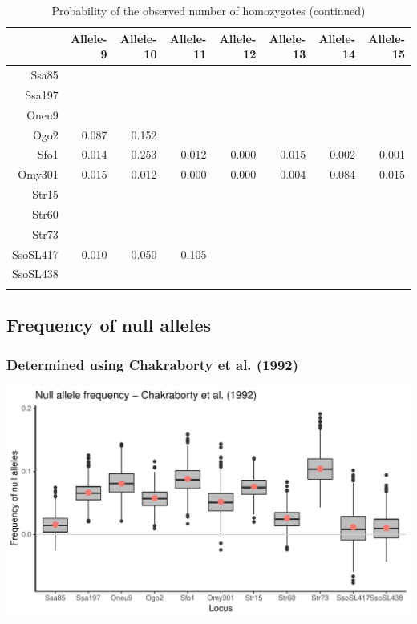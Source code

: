 \documentclass[a4paper]{scrartcl}\usepackage[]{graphicx}\usepackage[]{color}
\makeatletter
\def\maxwidth{ %
  \ifdim\Gin@nat@width>\linewidth
    \linewidth
  \else
    \Gin@nat@width
  \fi
}
\newenvironment{knitrout}{}{} %
\makeatother
\begin{document}
\begin{table}[ht]
\centering
\begin{tabular}{rrrrrrrr}
  \hline
 & Allele-9 & Allele-10 & Allele-11 & Allele-12 & Allele-13 & Allele-14 & Allele-15 \\ 
  \hline
Ssa85 &  &  &  &  &  &  &  \\ 
   \rowcolor[gray]{0.9} Ssa197 &  &  &  &  &  &  &  \\ 
  Oneu9 &  &  &  &  &  &  &  \\ 
   \rowcolor[gray]{0.9} Ogo2 & 0.087 & 0.152 &  &  &  &  &  \\ 
  Sfo1 & 0.014 & 0.253 & 0.012 & 0.000 & 0.015 & 0.002 & 0.001 \\ 
   \rowcolor[gray]{0.9} Omy301 & 0.015 & 0.012 & 0.000 & 0.000 & 0.004 & 0.084 & 0.015 \\ 
  Str15 &  &  &  &  &  &  &  \\ 
   \rowcolor[gray]{0.9} Str60 &  &  &  &  &  &  &  \\ 
  Str73 &  &  &  &  &  &  &  \\ 
   \rowcolor[gray]{0.9} SsoSL417 & 0.010 & 0.050 & 0.105 &  &  &  &  \\ 
  SsoSL438 &  &  &  &  &  &  &  \\ 
   \rowcolor[gray]{0.9}  \hline
\end{tabular}
\caption{Probability of the observed number of homozygotes (continued)} 
\end{table}


\FloatBarrier

\subsection{Frequency of null alleles}
\subsubsection{Determined using Chakraborty et al. (1992)}


\begin{knitrout}
\color{fgcolor}
\includegraphics[width=\maxwidth]{PopGenReport_Hatchery-null_all_Chakraborty-1} 

\end{knitrout}
\end{document}
